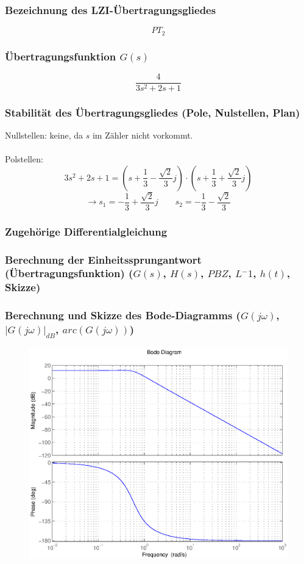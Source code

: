 \documentclass[a4paper,10pt,fleqn]{article}
\begin{document}
\subsubsection*{Bezeichnung des LZI-Übertragungsgliedes}
\[ PT_2 \]

\subsubsection*{Übertragungsfunktion $G(s)$}
\[ \frac{4}{3 s^2 + 2 s + 1} \]

\subsubsection*{Stabilität des Übertragungsgliedes (Pole, Nulstellen, Plan)}
Nullstellen: keine, da $s$ im Zähler nicht vorkommt. \\\\
Polstellen: 
\[ 3 s^2 + 2 s + 1 = \left(s + \frac{1}{3} - \frac{\sqrt{2}}{3}j\right) \cdot \left(s + \frac{1}{3} + \frac{\sqrt{2}}{3}j\right) \]
\[ \rightarrow s_1 = -\frac{1}{3} + \frac{\sqrt{2}}{3}j \qquad s_2 = -\frac{1}{3} - \frac{\sqrt{2}}{3} \]

\subsubsection*{Zugehörige Differentialgleichung}

\subsubsection*{Berechnung der Einheitssprungantwort (Übertragungsfunktion) ($G(s)$, $H(s)$, $PBZ$, $L^-1$, $h(t)$, Skizze)}

\subsubsection*{Berechnung und Skizze des Bode-Diagramms ($G(j\omega)$, $|G(j\omega)|_{dB}$, $arc(G(j\omega))$)}
\begin{figure}[h!]
\center
\includegraphics[width=\textwidth]{bode.eps}
\end{figure}
\end{document}
